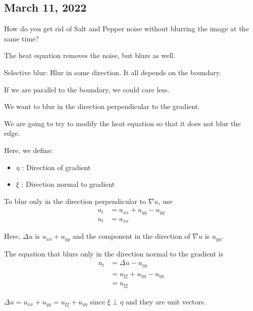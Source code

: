 \documentclass{article}
\begin{document}
\subsection*{March 11, 2022}
How do you get rid of Salt and Pepper noise without blurring the image at the same time?

The heat equation removes the noise, but blurs as well.


Selective blur: Blur in some direction. It all depends on the boundary.

If we are parallel to the boundary, we could care less.

We want to blur in the direction perpendicular to the gradient.



We are going to try to modify the heat equation so that it does not blur the edge.


Here, we define:

\begin{itemize}
  \item $\eta$ : Direction of gradient
  \item $\xi$ : Direction normal to gradient
\end{itemize}

To blur only in the direction perpendicular to $\nabla u$, use
%
\begin{align}
  u_t & = u_{xx} + u_{yy} - u_{yy}\\
  u_t & = u_{xx}
\end{align}

Here, $\Delta u$ is $u_{xx} + u_{yy}$ and the component in the direction of $\nabla u$ is $u_{yy}$.

The equation that blurs only in the direction normal to the gradient is
%
\begin{align}
  u_t & = \Delta u - u_{\eta \eta}\\
  & = u_{\xi \xi} + u_{\eta \eta} - u_{\eta \eta}\\
  & = u_{\xi \xi}
\end{align}

\note $\Delta u = u_{xx} + u_{yy} = u_{\xi \xi} + u_{\eta \eta}$ since $\xi \perp \eta$ and they are unit vectors.
\end{document}
